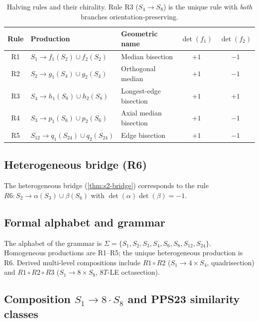 \documentclass[11pt,a4paper]{article}
\theoremstyle{plain}
\theoremstyle{definition}
\theoremstyle{remark}
\begin{document}
\begin{table}[H]
\centering\small
\caption{Halving rules and their chirality.  Rule R3 ($S_{4} \to S_{8}$) is
the unique rule with \emph{both} branches orientation-preserving.}
\label{tab:ifs-rules}
\begin{tabular}{@{} c l l c c @{}}
\toprule
Rule & Production & Geometric name & $\det(f_{1})$ & $\det(f_{2})$ \\
\midrule
R1 & $S_{1} \to f_{1}(S_{2}) \cup f_{2}(S_{2})$          & Median bisection            & $+1$ & $-1$ \\
R2 & $S_{2} \to g_{1}(S_{4}) \cup g_{2}(S_{4})$          & Orthogonal median           & $+1$ & $-1$ \\
R3 & $S_{4} \to h_{1}(S_{8}) \cup h_{2}(S_{8})$          & Longest-edge bisection      & $+1$ & $+1$ \\
R4 & $S_{3} \to p_{1}(S_{6}) \cup p_{2}(S_{6})$          & Axial median bisection      & $+1$ & $-1$ \\
R5 & $S_{12} \to q_{1}(S_{24}) \cup q_{2}(S_{24})$       & Edge bisection              & $+1$ & $-1$ \\
\bottomrule
\end{tabular}
\end{table}

\subsection{Heterogeneous bridge (R6)}

The heterogeneous bridge (\cref{thm:s2-bridge}) corresponds to the rule
$R6 \colon S_{2} \to \alpha(S_{3}) \cup \beta(S_{6})$ with
$\det(\alpha)\det(\beta) = -1$.

\subsection{Formal alphabet and grammar}

The alphabet of the grammar is
$\Sigma = \{S_{1}, S_{2}, S_{3}, S_{4}, S_{6}, S_{8}, S_{12}, S_{24}\}$.
Homogeneous productions are R1--R5; the unique heterogeneous production is
R6.  Derived multi-level compositions include $R1 \circ R2$
($S_{1} \to 4 \times S_{4}$, quadrisection) and $R1 \circ R2 \circ R3$
($S_{1} \to 8 \times S_{8}$, $8T$-LE octasection).

\subsection{Composition \texorpdfstring{$S_{1} \to 8 \cdot S_{8}$}{S1 -> 8 S8}
and PPS23 similarity classes}
\end{document}
